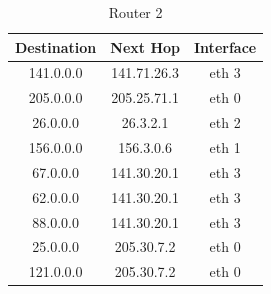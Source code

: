 \documentclass{WeSTassignment}
\begin{document}
\begin{table}[h]
\centering
\caption{Router 2}
\label{Router 2}
\begin{tabular}{ccc}
\hline
\multicolumn{1}{|c|}{\textbf{Destination}} & \multicolumn{1}{c|}{\textbf{Next Hop}} & \multicolumn{1}{c|}{\textbf{Interface}} \\ \hline
141.0.0.0                                  & 141.71.26.3                            & eth 3                                   \\
205.0.0.0                                  & 205.25.71.1                            & eth 0                                   \\
26.0.0.0                                   & 26.3.2.1                               & eth 2                                    \\
156.0.0.0                                  & 156.3.0.6                              & eth 1                                   \\
67.0.0.0                                   & 141.30.20.1                            & eth 3                                   \\
62.0.0.0                                   & 141.30.20.1                            & eth 3                                   \\
88.0.0.0                                   & 141.30.20.1                            & eth 3                                    \\
25.0.0.0                                   & 205.30.7.2                             & eth 0                                   \\
121.0.0.0                                  & 205.30.7.2                             & eth 0                                  
\end{tabular}
\end{table}
\end{document}
